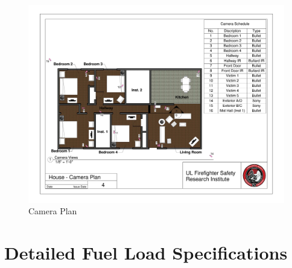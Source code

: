 \begin{figure}
\includegraphics[width=\textheight]{../0_Images/Appendix_Figures/Camera_Plan}
\caption[]{Camera Plan}
\label{fig:appendix_cameras}
\end{figure}

\clearpage
\chapter{Detailed Fuel Load Specifications} \label{App:Fuels}

